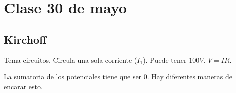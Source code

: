 \section{Clase 30 de mayo}

\subsection{Kirchoff}

Tema circuitos.
Circula una sola corriente (\(I_1\)).
Puede tener \(100V\).
\(V=IR\).

La sumatoria de los potenciales tiene que ser 0.
Hay diferentes maneras de encarar esto.
